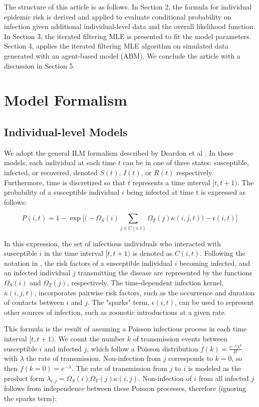 \documentclass{article}
\begin{document}
The structure of this article is as follows. In Section 2, the formula for individual epidemic risk is derived and applied to evaluate conditional probability on infection given additional individual-level data and the overall likelihood function. In Section 3, the iterated filtering MLE is presented to fit the model parameters. Section 4, applies the iterated filtering MLE algorithm on simulated data generated with an agent-based model (ABM). We conclude the article with a discussion in Section 5.

\section{Model Formalism}

\subsection{Individual-level Models}

We adopt the general ILM formalism described by Deardon et al \cite{Deardon2010}. In these models, each individual at each time $t$ can be in one of three states: susceptible, infected, or recovered, denoted $S(t)$, $I(t)$, or $R(t)$ respectively. Furthermore, time is discretized so that $t$ represents a time interval $[t, t + 1)$. The probability of a susceptible individual $i$ being infected at time t is expressed as follows:

\begin{equation}
P(i, t)=1-\exp\big[ \big( -\Omega_{S}(i) \sum\limits_{j \in C(i, t)} \Omega_{T}(j) \kappa(i, j, t)\big) - \epsilon(i, t)\big]
\end{equation}

In this expression, the set of infectious individuals who interacted with susceptible $i$ in the time interval $[t, t + 1)$ is denoted as $C(i, t)$. Following the notation in \cite{Deardon2010}, the risk factors of a susceptible individual $i$ becoming infected, and an infected individual $j$ transmitting the disease are represented by the functions $\Omega_{S}(i)$ and $\Omega_{T}(j)$, respectively. The time-dependent infection kernel, $\kappa(i, j, t)$, incorporates pairwise risk factors, such as the occurrence and duration of contacts between $i$ and $j$. The "sparks" term, $\epsilon(i, t)$, can be used to represent other sources of infection, such as zoonotic introductions at a given rate.

This formula is the result of assuming a Poisson infectious process in each time interval $[t, t + 1)$. We count the number $k$ of transmission events between susceptible $i$ and infected $j$, which follow a Poisson distribution $f\left( k \right) = \frac{{e^{ - \lambda } \lambda ^k }}{{k!}}$ with $\lambda$ the rate of transmission. Non-infection from $j$ corresponds to $k=0$, so then $f(k=0)=e^{ - \lambda }$. The rate of transmission from $j$ to $i$ is modeled as the product form $\lambda_{i,j}=\Omega_{S}(i)\Omega_{T}(j) \kappa(i, j)$. Non-infection of $i$ from all infected $j$ follows from independence between these Poisson processes, therefore (ignoring the sparks term):
\end{document}

